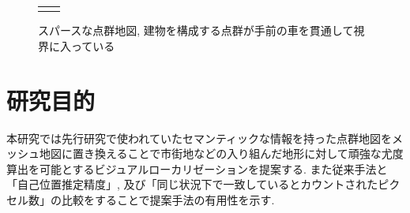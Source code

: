 \begin{figure}[htbp]
\begin{tabular}{cc}
\begin{minipage}{1.0\hsize}
\begin{center}
\caption{スパースな点群地図, 建物を構成する点群が手前の車を貫通して視界に入っている}
\label{fig:Point_Cloud_Map}
\end{center}
\end{minipage}
\end{tabular}
\end{figure}

\newpage
 
 \section{研究目的}
 本研究では先行研究で使われていたセマンティックな情報を持った点群地図をメッシュ地図に置き換えることで市街地などの入り組んだ地形に対して頑強な尤度算出を可能とするビジュアルローカリゼーションを提案する. また従来手法と「自己位置推定精度」, 及び「同じ状況下で一致しているとカウントされたピクセル数」の比較をすることで提案手法の有用性を示す.